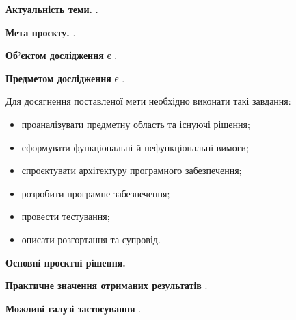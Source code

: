 
\textbf{Актуальність теми.}  \cite{example-docs}.

\textbf{Мета проєкту.} .

\textbf{Об'єктом дослідження} є .

\textbf{Предметом дослідження} є .

Для досягнення поставленої мети необхідно виконати такі завдання:
\begin{itemize}
\item проаналізувати предметну область та існуючі рішення;
\item сформувати функціональні й нефункціональні вимоги;
\item спроєктувати архітектуру програмного забезпечення;
\item розробити програмне забезпечення;
\item провести тестування;
\item описати розгортання та супровід.
\end{itemize}

\textbf{Основні проєктні рішення.} 

\textbf{Практичне значення отриманих результатів} .

\textbf{Можливі галузі застосування} .

